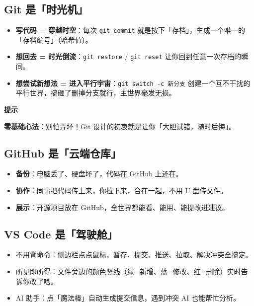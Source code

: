 \documentclass[12pt,a4paper,openany]{ctexbook}
\newenvironment{tipbox}{%
  \medskip
  \noindent\textbf{\faLightbulb\; 提示}
  \smallskip
}{%
  \medskip
}
\begin{document}
\subsection{Git 是「时光机」}

\begin{itemize}[leftmargin=2em]
  \item \textbf{写代码 = 穿越时空}：每次 \texttt{git commit} 就是按下「存档」，生成一个唯一的「存档编号」（哈希值）。
  \item \textbf{想回去 = 时光倒流}：\texttt{git restore} / \texttt{git reset} 让你回到任意一次存档的瞬间。
  \item \textbf{想尝试新想法 = 进入平行宇宙}：\texttt{git switch -c 新分支} 创建一个互不干扰的平行世界，搞砸了删掉分支就行，主世界毫发无损。
\end{itemize}

\begin{tipbox}
\textbf{零基础心法}：别怕弄坏！Git 设计的初衷就是让你「大胆试错，随时后悔」。
\end{tipbox}

\subsection{GitHub 是「云端仓库」}

\begin{itemize}[leftmargin=2em]
  \item \textbf{备份}：电脑丢了、硬盘坏了，代码在 GitHub 上还在。
  \item \textbf{协作}：同事把代码传上来，你拉下来，合在一起，不用 U 盘传文件。
  \item \textbf{展示}：开源项目放在 GitHub，全世界都能看、能用、能提改进建议。
\end{itemize}

\subsection{VS Code 是「驾驶舱」}

\begin{itemize}[leftmargin=2em]
  \item 不用背命令：侧边栏点点鼠标，暂存、提交、推送、拉取、解决冲突全搞定。
  \item 所见即所得：文件旁边的颜色竖线（绿=新增、蓝=修改、红=删除）实时告诉你改了啥。
  \item AI 助手：点「魔法棒」自动生成提交信息，遇到冲突 AI 也能帮忙分析。
\end{itemize}
\end{document}
